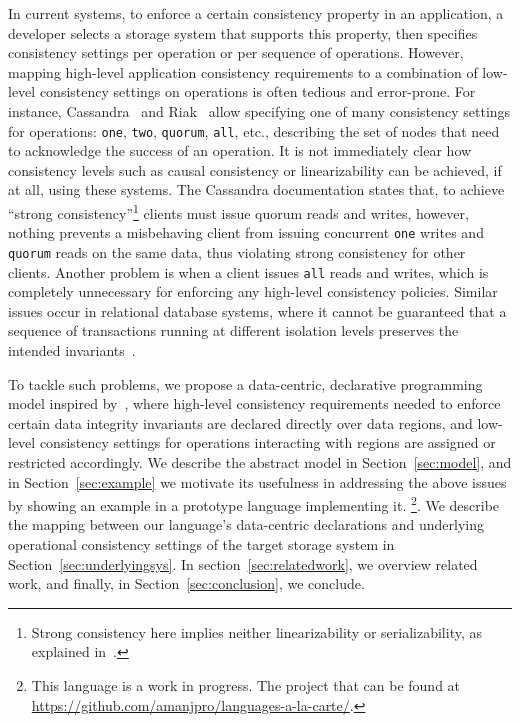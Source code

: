\documentclass[numbers]{sigplanconf}
\begin{document}
In current systems, to enforce a certain consistency
property in an application, a developer selects a storage system that
supports this property, then specifies consistency settings per
operation or per sequence of operations. However, mapping high-level 
application consistency requirements to a combination of
low-level consistency settings on operations is often tedious and error-prone.
For instance, Cassandra~\cite{lakshman2010cassandra} and Riak~\cite{riak} allow 
specifying one of many consistency settings for operations:
\texttt{one}, \texttt{two}, \texttt{quorum}, \texttt{all}, etc., describing
the set of nodes that need to acknowledge the success of an operation. It
is not immediately clear how consistency levels such as causal consistency or
linearizability can be achieved, if at all, using these systems. The Cassandra documentation
states that, to achieve ``strong consistency''\footnote{Strong consistency here implies
neither linearizability or serializability, as explained 
in~\cite{sivaramakrishnan2016representation}.} clients must issue quorum reads and writes,
however, nothing prevents a misbehaving client from issuing concurrent \texttt{one} writes and
\texttt{quorum} reads on the same data, thus violating strong consistency for other clients. Another
problem is when a client issues \texttt{all} reads and writes, which is completely
unnecessary for enforcing any high-level consistency policies. Similar issues
occur in relational database systems, where it cannot be guaranteed that a
sequence of transactions running at different isolation levels preserves the intended
invariants~\cite{gray1992transaction}. 

To tackle such problems, we propose a data-centric, declarative programming
model inspired by~\cite{dolby2012data}, where high-level consistency
requirements needed to enforce certain data integrity invariants 
are declared directly over data regions, and low-level 
consistency settings for operations interacting with
regions are assigned or restricted accordingly. We
describe the abstract model in Section~\ref{sec:model}, and in
Section~\ref{sec:example} we motivate its usefulness in addressing the above 
issues by showing an example in a prototype language implementing it.
\footnote{This language is a work in progress. The project that can be found at
  \url{https://github.com/amanjpro/languages-a-la-carte/}.}.
We describe the mapping between our language's data-centric declarations and 
underlying operational consistency settings of the target storage system in 
Section~\ref{sec:underlyingsys}.  In section~\ref{sec:relatedwork}, we overview 
related work, and finally, in Section~\ref{sec:conclusion}, we conclude.
\end{document}
